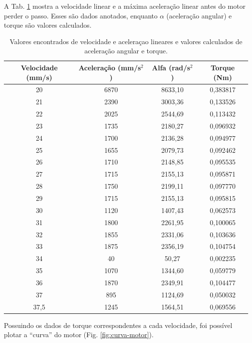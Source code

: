 A Tab. \ref{tab:valores-v-torques} mostra a velocidade linear e a máxima aceleração linear antes do motor perder o passo. Esses são dados anotados, enquanto $\alpha$ (aceleração angular) e torque são valores calculados.

\begin{table}[H]
    \centering
    \begin{tabular}{|c|c|c|c|}
    \hline
    \textbf{Velocidade (mm/s)}&\textbf{Aceleração (mm/s$^2$)}&\textbf{Alfa (rad/s$^2$)}&\textbf{Torque (Nm)}\\\hline
    20 & 6870 & 8633,10 & 0,383817 \\ \hline
    21 & 2390 & 3003,36 & 0,133526 \\ \hline
    22 & 2025 & 2544,69 & 0,113432 \\ \hline
    23 & 1735 & 2180,27 & 0,096932 \\ \hline
    24 & 1700 & 2136,28 & 0,094977 \\ \hline
    25 & 1655 & 2079,73 & 0,092462 \\ \hline
    26 & 1710 & 2148,85 & 0,095535 \\ \hline
    27 & 1715 & 2155,13 & 0,095871 \\ \hline
    28 & 1750 & 2199,11 & 0,097770 \\ \hline
    29 & 1715 & 2155,13 & 0,095815 \\ \hline
    30 & 1120 & 1407,43 & 0,062573 \\ \hline
    31 & 1800 & 2261,95 & 0,100065 \\ \hline
    32 & 1855 & 2331,06 & 0,103636 \\ \hline
    33 & 1875 & 2356,19 & 0,104754 \\ \hline
    34 & 40 & 50,27 & 0,002235 \\ \hline
    35 & 1070 & 1344,60 & 0,059779 \\ \hline
    36 & 1870 & 2349,91 & 0,104477 \\ \hline
    37 & 895 & 1124,69 & 0,050032 \\ \hline
    37,5 & 1245 & 1564,51 & 0,069556 \\ \hline
    \end{tabular}
    \caption{Valores encontrados de velocidade e aceleraçao lineares e valores calculados de aceleração angular e torque.}
    \label{tab:valores-v-torques}
\end{table}

Possuindo os dados de torque correspondentes a cada velocidade, foi possível plotar a “curva” do motor (Fig. \ref{fig:curva-motor}).

